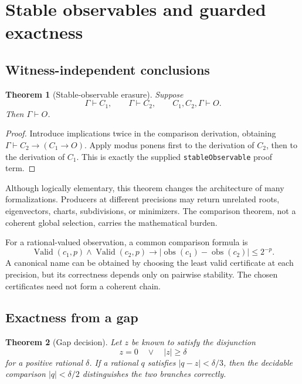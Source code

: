 \documentclass[11pt]{article}
\newtheorem{theorem}{Theorem}[section]
\newcommand{\obs}{\mathop{\mathrm{obs}}}
\newcommand{\valid}{\mathop{\mathrm{Valid}}}
\begin{document}
\section{Stable observables and guarded exactness}
\label{sec:stable}

\subsection{Witness-independent conclusions}

\begin{theorem}[Stable-observable erasure]
\label{thm:stable}
Suppose
\[
  \Gamma\vdash C_1,\qquad \Gamma\vdash C_2,
  \qquad C_1,C_2,\Gamma\vdash O.
\]
Then \(\Gamma\vdash O\).
\end{theorem}

\begin{proof}
Introduce implications twice in the comparison derivation, obtaining
\(\Gamma\vdash C_2\to(C_1\to O)\).  Apply modus ponens first to the derivation
of \(C_2\), then to the derivation of \(C_1\).  This is exactly the supplied
\texttt{stableObservable} proof term.
\end{proof}

Although logically elementary, this theorem changes the architecture of many
formalizations.  Producers at different precisions may return unrelated roots,
eigenvectors, charts, subdivisions, or minimizers.  The comparison theorem,
not a coherent global selection, carries the mathematical burden.

For a rational-valued observation, a common comparison formula is
\[
  \valid(c_1,p)\wedge\valid(c_2,p)
  \longrightarrow
  |\obs(c_1)-\obs(c_2)|\le 2^{-p}.
\]
A canonical name can be obtained by choosing the least valid certificate at
each precision, but its correctness depends only on pairwise stability.  The
chosen certificates need not form a coherent chain.

\subsection{Exactness from a gap}

\begin{theorem}[Gap decision]
\label{thm:gap}
Let \(z\) be known to satisfy the disjunction
\[
  z=0\quad\vee\quad |z|\ge\delta
\]
for a positive rational \(\delta\).  If a rational \(q\) satisfies
\(|q-z|<\delta/3\), then the decidable comparison
\(|q|<\delta/2\) distinguishes the two branches correctly.
\end{theorem}
\end{document}
